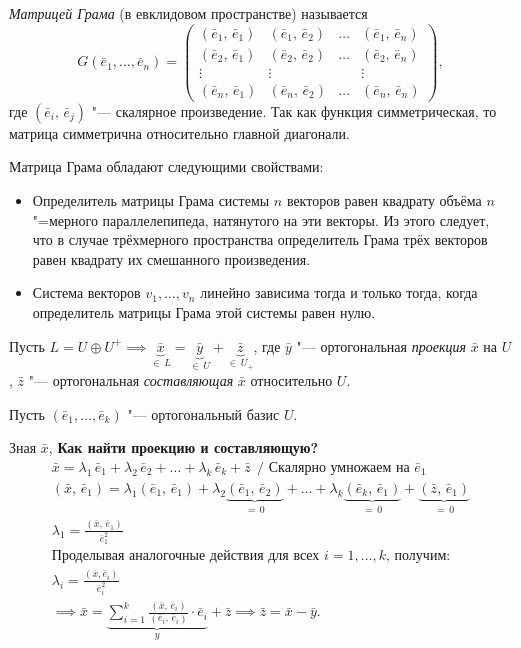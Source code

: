\begin{definition}
  \textit{Матрицей Грама} (в евклидовом пространстве) называется $$
  G(\bar{e}_1, \ldots, \bar{e}_n) = \begin{pmatrix}
    (\bar{e}_1,\, \bar{e}_1) & (\bar{e}_1,\, \bar{e}_2) & \ldots & (\bar{e}_1,\, \bar{e}_n) \\
    (\bar{e}_2,\, \bar{e}_1) & (\bar{e}_2,\, \bar{e}_2) & \ldots & (\bar{e}_2,\, \bar{e}_n) \\
    \vdots & \vdots && \vdots \\
    (\bar{e}_n,\, \bar{e}_1) & (\bar{e}_n,\, \bar{e}_2) & \ldots & (\bar{e}_n,\, \bar{e}_n)
  \end{pmatrix},
  $$
  где $(\bar{e}_i,\, \bar{e}_j)$ "--- скалярное произведение. Так как функция симметрическая, то матрица симметрична относительно главной диагонали.
\end{definition}
Матрица Грама обладают следующими свойствами:
\begin{itemize}
  \item[] Определитель матрицы Грама системы $n$ векторов равен квадрату объёма 
  $n$"=мерного параллелепипеда, натянутого на эти векторы. Из этого следует, что в случае трёхмерного пространства определитель Грама трёх векторов равен квадрату их смешанного произведения.
  \item[] Система векторов $v_1, \ldots, v_n$ линейно зависима тогда и только тогда, когда определитель матрицы Грама этой системы равен нулю.
\end{itemize}

Пусть $L = U \oplus U^+ \implies \underbrace{\bar{x}}_{\in \, L} = \underbrace{\bar{y}}_{\in \, U} + \underbrace{\bar{z}}_{\in\, U_+}$, где $\bar{y}$ "--- ортогональная \textit{проекция} $\bar{x}$ на $U$, $\bar{z}$ "--- ортогональная \textit{составляющая} $\bar{x}$ относительно $U$.

Пусть $(\bar{e}_1, \ldots, \bar{e}_k)$ "--- ортогональный базис $U$.

Зная $\bar{x}$,
\textbf{Как найти проекцию и составляющую?}
\begin{gather*}
  \bar{x} = \lambda_1 \, \bar{e}_1 + \lambda_2 \, \bar{e}_2 + \ldots + \lambda_k \, \bar{e}_k + \bar{z} ~~/ \text{ Скалярно умножаем на } \bar{e}_1 \\
  (\bar{x}, \, \bar{e}_1) = \lambda_1(\bar{e}_1,\, \bar{e}_1) + \lambda_2\underbrace{(\bar{e}_1, \, \bar{e}_2)}_{ = \, 0} + \ldots + \lambda_k \underbrace{(\bar{e}_k, \, \bar{e}_1)}_{ = \, 0} + \underbrace{(\bar{z}, \, \bar{e}_1)}_{= \, 0} \\
  \lambda_1 = \frac{(\bar{x}, \, \bar{e}_1)}{\bar{e}_1^2} \\
  \text{Проделывая аналогочные действия для всех } i = 1, \ldots, k  \text{, получим:}\\
  \lambda_i = \frac{(\bar{x}, \bar{e}_i)}{\bar{e}_i^2} \\
  \implies \bar{x} = \underbrace{\sum_{i = 1}^{k} \frac{(\bar{x}, \, \bar{e}_i)}{(\bar{e}_i, \, \bar{e}_i)} \cdot \bar{e}_i}_{y} + \bar{z} \implies \bar{z} = \bar{x} - \bar{y}.  
\end{gather*}

